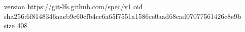 version https://git-lfs.github.com/spec/v1
oid sha256:6f8148346aaeb9c60cfb4cc6a65f7551a1586ce0aad68cad07077561426c8e9b
size 408
